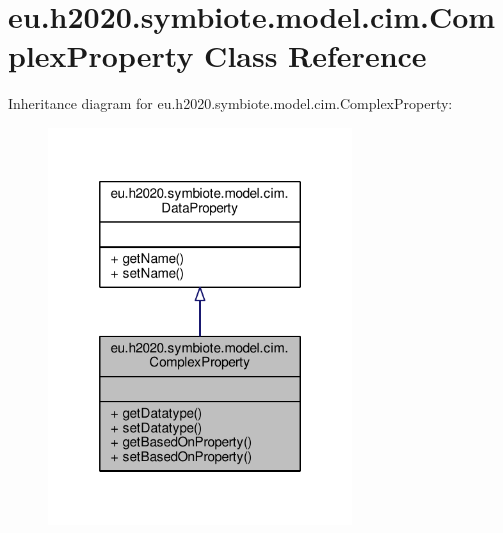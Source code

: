 \hypertarget{classeu_1_1h2020_1_1symbiote_1_1model_1_1cim_1_1ComplexProperty}{}\section{eu.\+h2020.\+symbiote.\+model.\+cim.\+Complex\+Property Class Reference}
\label{classeu_1_1h2020_1_1symbiote_1_1model_1_1cim_1_1ComplexProperty}


Inheritance diagram for eu.\+h2020.\+symbiote.\+model.\+cim.\+Complex\+Property\+:\nopagebreak
\begin{figure}[H]
\begin{center}
\leavevmode
\includegraphics[width=228pt]{classeu_1_1h2020_1_1symbiote_1_1model_1_1cim_1_1ComplexProperty__inherit__graph}
\end{center}
\end{figure}


